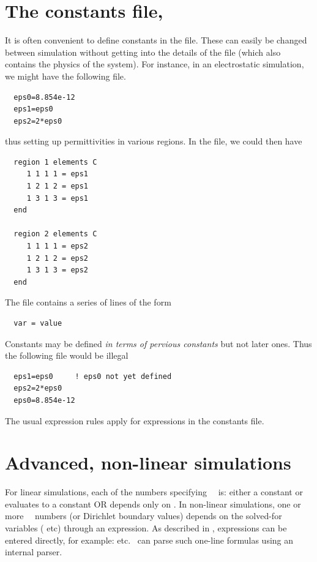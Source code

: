 \documentclass[a4paper,twoside,11pt]{book}
\begin{document}
\section{The constants file, }
\label{constfile}

It is often convenient to define constants in the 
file. These can easily be changed between simulation without getting
into the details of the  file (which also contains the
physics of the system). For instance, in an electrostatic simulation,
we might have the following  file.
\begin{verbatim}
  eps0=8.854e-12
  eps1=eps0
  eps2=2*eps0
\end{verbatim}
thus setting up permittivities in various regions. In the  file, we could then have
\begin{verbatim}
  region 1 elements C 
     1 1 1 1 = eps1
     1 2 1 2 = eps1
     1 3 1 3 = eps1
  end

  region 2 elements C 
     1 1 1 1 = eps2
     1 2 1 2 = eps2
     1 3 1 3 = eps2
  end
\end{verbatim}

The  file contains a series of lines of the form
\begin{verbatim}
  var = value
\end{verbatim}
Constants may be defined \emph{in terms of pervious constants} but not
later ones. Thus the following  file would be illegal
\begin{verbatim}
  eps1=eps0     ! eps0 not yet defined
  eps2=2*eps0
  eps0=8.854e-12
\end{verbatim}
The usual expression rules apply for expressions in the constants file.

\section{Advanced, non-linear simulations}
\label{nonlin}
For linear simulations, each of the numbers specifying \caf\, \qg\ is:
either a constant or evaluates to a constant OR depends only on
. In non-linear simulations, one or more \caf\,
\qg\ numbers (or Dirichlet boundary values) depends on the solved-for
variables ( etc) through an expression. As described in
, expressions can be entered directly, for example:
 etc. \zinc\ can parse such one-line formulas using an
internal parser.
\end{document}
